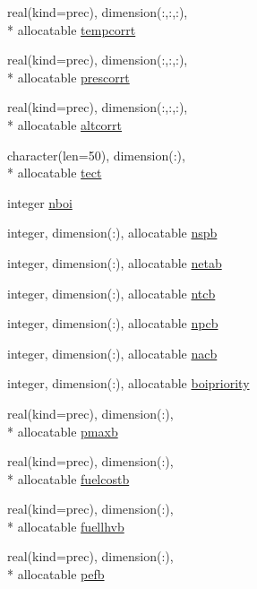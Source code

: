 \begin{DoxyCompactItemize}
real(kind=prec), dimension(\-:,\-:,\-:), \\*
allocatable \hyperlink{classinputvar_a918356589b5f04f76333e6a65de35fb8}{tempcorrt}
\item 
real(kind=prec), dimension(\-:,\-:,\-:), \\*
allocatable \hyperlink{classinputvar_a4dc6d715b00d35dbff920be5c37c1d89}{prescorrt}
\item 
real(kind=prec), dimension(\-:,\-:,\-:), \\*
allocatable \hyperlink{classinputvar_a1405821026cba8a541725451f5a6f8dd}{altcorrt}
\item 
character(len=50), dimension(\-:), \\*
allocatable \hyperlink{classinputvar_afb7d5163d753c7bbd2c1505e8ee68197}{tect}
\item 
integer \hyperlink{classinputvar_a168bc1dcb73e68b3620991b6494f3797}{nboi}
\item 
integer, dimension(\-:), allocatable \hyperlink{classinputvar_aa1e78ecd4b3cbb3f08b770cf604a5d3d}{nspb}
\item 
integer, dimension(\-:), allocatable \hyperlink{classinputvar_af109996c7b379bac5d6c3d89c5b6df1d}{netab}
\item 
integer, dimension(\-:), allocatable \hyperlink{classinputvar_a41aaaf97cb1f1e815c73bcfa5f975be3}{ntcb}
\item 
integer, dimension(\-:), allocatable \hyperlink{classinputvar_a4f83c89634ccb8f94fca08a023648791}{npcb}
\item 
integer, dimension(\-:), allocatable \hyperlink{classinputvar_ae517f545e388b4352b7941203efa8449}{nacb}
\item 
integer, dimension(\-:), allocatable \hyperlink{classinputvar_a87efe639d66848f1a52e1c265e175e2c}{boipriority}
\item 
real(kind=prec), dimension(\-:), \\*
allocatable \hyperlink{classinputvar_a29e37a8460969d1438ed9aeb5d37d798}{pmaxb}
\item 
real(kind=prec), dimension(\-:), \\*
allocatable \hyperlink{classinputvar_a7ba5eba73efe4e693920d6af7782e58e}{fuelcostb}
\item 
real(kind=prec), dimension(\-:), \\*
allocatable \hyperlink{classinputvar_a3cd62c9288fded8bd8de8066cbb3ca20}{fuellhvb}
\item 
real(kind=prec), dimension(\-:), \\*
allocatable \hyperlink{classinputvar_a3484e64c94e8f61527a9843039243703}{pefb}

\end{DoxyCompactItemize}
